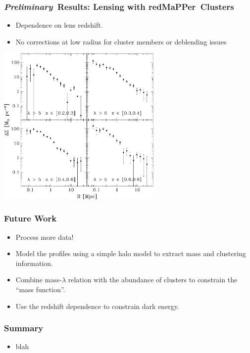 \documentclass{beamer}
\newcommand{\redmapper}{redMaPPer}
\newcommand{\prelim}{{\bf{\it Preliminary}}}
\begin{document}
\frame
{
    \frametitle{\prelim\ Results: Lensing with \redmapper\ Clusters}

    \begin{itemize}

        \item Dependence on lens redshift.

        \item No corrections at low radius for cluster members or deblending issues

    \end{itemize}


    \begin{center}
        \includegraphics[width=0.6\textwidth]{run-rm008-bin-lgt05-zbin4-jack.pdf}
    \end{center}

}

\frame
{
    \frametitle{Future Work}

    \begin{itemize}

        \item Process more data!

        \item Model the profiles using a simple halo model to extract
            mass and clustering information.

        \item Combine mass-$\lambda$ relation with the abundance of clusters to
            constrain the ``mass function''.

        \item Use the redshift dependence to constrain dark energy.

    \end{itemize}

}

\frame
{
    \frametitle{Summary}

    \begin{itemize}

        \item blah

    \end{itemize}

}
\end{document}
